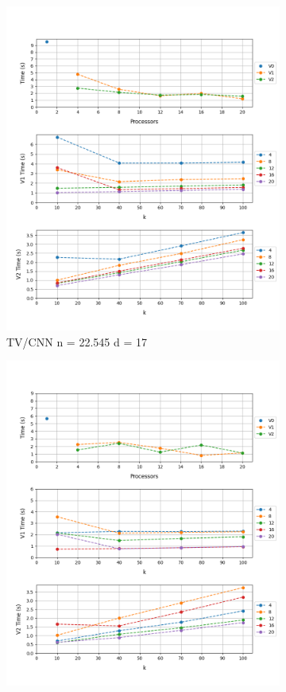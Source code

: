 \documentclass[12pt, a4paper]{article}
\begin{document}
\begin{figure}[h!]
\begin{subfigure}[b]{0.33\textwidth}
         \includegraphics[height=.20\textheight, width=\textwidth, keepaspectratio]{assets/tv/cnn.png}
         \caption{TV/CNN n = 22.545 d = 17}
     \end{subfigure}
     \begin{subfigure}[b]{0.33\textwidth}
         \centering
         \includegraphics[height=.20\textheight, width=\textwidth, keepaspectratio]{assets/tv/ndtv.png}

\end{subfigure}
\end{figure}
\end{document}
